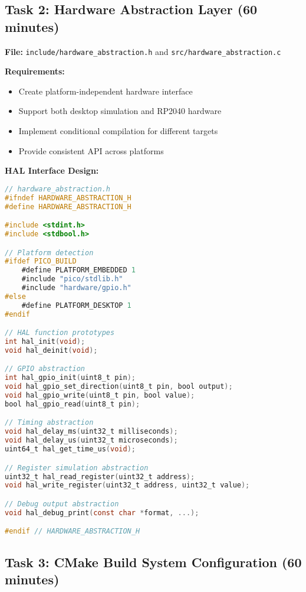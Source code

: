 \documentclass[11pt,a4paper]{article}
\begin{document}
\subsection{Task 2: Hardware Abstraction Layer (60 minutes)}

\textbf{File:} \texttt{include/hardware\_abstraction.h} and \texttt{src/hardware\_abstraction.c}

\textbf{Requirements:}
\begin{itemize}
    \item Create platform-independent hardware interface
    \item Support both desktop simulation and RP2040 hardware
    \item Implement conditional compilation for different targets
    \item Provide consistent API across platforms
\end{itemize}

\textbf{HAL Interface Design:}
\begin{lstlisting}[language=C]
// hardware_abstraction.h
#ifndef HARDWARE_ABSTRACTION_H
#define HARDWARE_ABSTRACTION_H

#include <stdint.h>
#include <stdbool.h>

// Platform detection
#ifdef PICO_BUILD
    #define PLATFORM_EMBEDDED 1
    #include "pico/stdlib.h"
    #include "hardware/gpio.h"
#else
    #define PLATFORM_DESKTOP 1
#endif

// HAL function prototypes
int hal_init(void);
void hal_deinit(void);

// GPIO abstraction
int hal_gpio_init(uint8_t pin);
void hal_gpio_set_direction(uint8_t pin, bool output);
void hal_gpio_write(uint8_t pin, bool value);
bool hal_gpio_read(uint8_t pin);

// Timing abstraction
void hal_delay_ms(uint32_t milliseconds);
void hal_delay_us(uint32_t microseconds);
uint64_t hal_get_time_us(void);

// Register simulation abstraction
uint32_t hal_read_register(uint32_t address);
void hal_write_register(uint32_t address, uint32_t value);

// Debug output abstraction
void hal_debug_print(const char *format, ...);

#endif // HARDWARE_ABSTRACTION_H
\end{lstlisting}

\subsection{Task 3: CMake Build System Configuration (60 minutes)}
\end{document}
